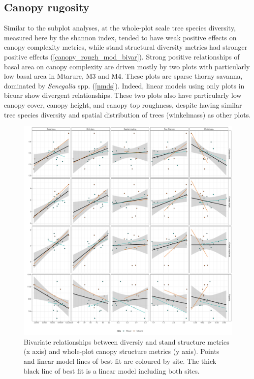 \documentclass[11pt,a4paper]{article}
\begin{document}


\subsection{Canopy rugosity}

Similar to the subplot analyses, at the whole-plot scale tree species diversity, measured here by the shannon index, tended to have weak positive effects on canopy complexity metrics, while stand structural diversity metrics had stronger positive effects (\autoref{canopy_rough_mod_bivar}). Strong positive relationships of basal area on canopy complexity are driven mostly by two plots with particularly low basal area in Mtarure, M3 and M4. These plots are sparse thorny savanna, dominated by \textit{Senegalia} spp. (\autoref{nmds}). Indeed, linear models using only plots in bicuar show divergent relationships. These two plots also have particularly low canopy cover, canopy height, and canopy top roughness, despite having similar tree species diversity and spatial distribution of trees (winkelmass) as other plots.

\begin{figure}[H]
\centering
	\includegraphics[width=\textwidth]{canopy_rough_mod_bivar}
	\caption{Bivariate relationships between diversiy and stand structure metrics (x axis) and whole-plot canopy structure metrics (y axis). Points and linear model lines of best fit are coloured by site. The thick black line of best fit is a linear model including both sites.}
	\label{canopy_rough_mod_bivar}
\end{figure}
\end{document}
